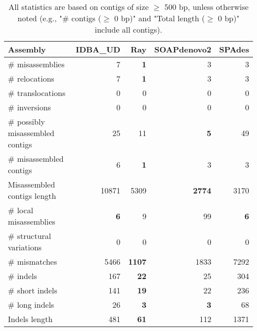 \documentclass[12pt,a4paper]{article}
\begin{document}
\begin{table}[ht]
\begin{center}
\caption{All statistics are based on contigs of size $\geq$ 500 bp, unless otherwise noted (e.g., "\# contigs ($\geq$ 0 bp)" and "Total length ($\geq$ 0 bp)" include all contigs).}
\begin{tabular}{|l*{4}{|r}|}
\hline
Assembly & IDBA\_UD & Ray & SOAPdenovo2 & SPAdes \\ \hline
\# misassemblies & 7 & {\bf 1} & 3 & 3 \\ \hline
\hspace{5mm}\# relocations & 7 & {\bf 1} & 3 & 3 \\ \hline
\hspace{5mm}\# translocations & 0 & 0 & 0 & 0 \\ \hline
\hspace{5mm}\# inversions & 0 & 0 & 0 & 0 \\ \hline
\# possibly misassembled contigs & 25 & 11 & {\bf 5} & 49 \\ \hline
\# misassembled contigs & 6 & {\bf 1} & 3 & 3 \\ \hline
Misassembled contigs length & 10871 & 5309 & {\bf 2774} & 3170 \\ \hline
\# local misassemblies & {\bf 6} & 9 & 99 & {\bf 6} \\ \hline
\# structural variations & 0 & 0 & 0 & 0 \\ \hline
\# mismatches & 5466 & {\bf 1107} & 1833 & 7292 \\ \hline
\# indels & 167 & {\bf 22} & 25 & 304 \\ \hline
\hspace{5mm}\# short indels & 141 & {\bf 19} & 22 & 236 \\ \hline
\hspace{5mm}\# long indels & 26 & {\bf 3} & {\bf 3} & 68 \\ \hline
Indels length & 481 & {\bf 61} & 112 & 1371 \\ \hline
\end{tabular}
\end{center}
\end{table}
\end{document}
